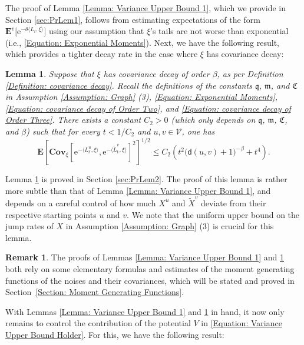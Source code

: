 \documentclass{amsart}
\numberwithin{equation}{section}
\newtheorem{lemma}[theorem]{Lemma}
\theoremstyle{definition}
\newtheorem{remark}[theorem]{Remark}
\newcommand\be{\beta}
\newcommand\mbf{\mathbf}
\newcommand\mf{\mathfrak}
\newcommand\mr{\mathrm}
\newcommand\ms{\mathscr}
\newcommand\msf{\mathsf}
\begin{document}
%

The proof of Lemma \ref{Lemma: Variance Upper Bound 1}, which we provide in Section \ref{sec:PrLem1},
follows from estimating expectations of the form $\mbf E^v\big[\mr e^{-\theta\langle L_t,\xi\rangle}\big]$
using our assumption that $\xi$'s tails are not worse than exponential (i.e., \eqref{Equation: Exponential Moments}).
Next, we have the following result, which provides a tighter decay rate
in the case where $\xi$ has covariance decay:

%

\begin{lemma}
\label{Lemma: Variance Upper Bound 2}
Suppose that $\xi$ has covariance decay of order $\beta$,
as per Definition \ref{Definition: covariance decay}.
Recall the definitions of the constants $\mf q$, $\mf m$, and $\mf C$
in Assumption \ref{Assumption: Graph} (3), \eqref{Equation: Exponential Moments},
\eqref{Equation: covariance decay of Order Two}, and \eqref{Equation: covariance decay of Order Three}.
There exists a constant $C_2>0$
(which only depends on $\mf q$, $\mf m$, $\mf C$, and $\be$)
such that for every $t<1/C_2$ and $u,v\in\ms V$, one has
\[\mbf E\left[\mbf{Cov}_\xi\left[\mr e^{-\langle L^u_t,\xi\rangle},\mr e^{-\langle\tilde L^v_t,\xi\rangle}\right]^2\right]^{1/2}\leq C_2\left(t^2\big(\msf d(u,v)+1\big)^{-\be}+t^4\right).\]
\end{lemma}

%

Lemma \ref{Lemma: Variance Upper Bound 2} is proved in Section \ref{sec:PrLem2}.
The proof of this lemma is rather more subtle than that of Lemma \ref{Lemma: Variance Upper Bound 1},
and depends on a careful control of how much $X^u$ and $\tilde X^v$ deviate from their
respective starting points $u$ and $v$. We note that the uniform upper bound on
the jump rates of $X$ in Assumption \ref{Assumption: Graph} (3) is crucial for this lemma.

%

\begin{remark}
The proofs of Lemmas \ref{Lemma: Variance Upper Bound 1} and \ref{Lemma: Variance Upper Bound 2} both rely on some elementary formulas and estimates of the moment generating functions of the noises and their covariances, which will be stated and proved in Section~\ref{Section: Moment Generating Functions}.
\end{remark}

%

With Lemmas \ref{Lemma: Variance Upper Bound 1} and \ref{Lemma: Variance Upper Bound 2}
in hand, it now only remains to control the contribution of the potential $V$ in \eqref{Equation: Variance Upper Bound Holder}.
For this, we have the following result:
\end{document}
